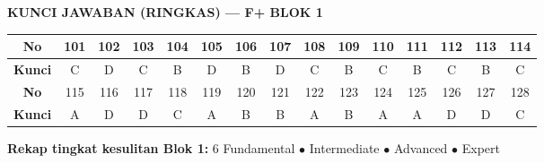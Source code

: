 \documentclass[11pt,a4paper]{exam}
\begin{document}
\begin{questions}
\end{questions}

\clearpage
{\large\bfseries\color{biru} KUNCI JAWABAN (RINGKAS) — F+ BLOK 1}\par
\vspace{8pt}
\renewcommand{\arraystretch}{1.3}
\begin{center}
\begin{tabular}{|c|*{14}{c|}}
\hline
\cellcolor{biru!15}\textbf{No} & 101 & 102 & 103 & 104 & 105 & 106 & 107 & 108 & 109 & 110 & 111 & 112 & 113 & 114\\\hline
\cellcolor{biru!15}\textbf{Kunci} & C & D & C & B & D & B & D & C & B & C & B & C & B & C\\\hline\hline
\cellcolor{biru!15}\textbf{No} & 115 & 116 & 117 & 118 & 119 & 120 & 121 & 122 & 123 & 124 & 125 & 126 & 127 & 128\\\hline
\cellcolor{biru!15}\textbf{Kunci} & A & D & D & C & A & B & B & A & B & A & A & D & D & C\\\hline
\end{tabular}
\end{center}

\vspace{8pt}
\begin{center}\small
\textbf{Rekap tingkat kesulitan Blok 1:}
6 Fundamental \;$\bullet$ Intermediate \;$\bullet$ Advanced \;$\bullet$ Expert
\end{center}
\end{document}

